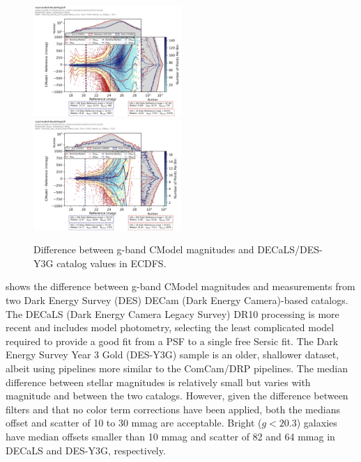 \begin{figure}
  \includegraphics[width=0.5\textwidth]{galaxy_photometry/cdfs_g_vs_DECaLS.png}
  \includegraphics[width=0.5\textwidth]{galaxy_photometry/cdfs_g_vs_desy3g.png}
  \caption{Difference between g-band CModel magnitudes and DECaLS/DES-Y3G catalog values in ECDFS.}
  \label{fig:cdfs_g_vs_des}
\end{figure}

 shows the difference between g-band CModel magnitudes and measurements from two Dark Energy Survey (DES) DECam (Dark Energy Camera)-based catalogs.
The DECaLS (Dark Energy Camera Legacy Survey) DR10 processing is more recent and includes model photometry, selecting the least complicated model required to provide a good fit from a PSF to a single free Sersic fit.
The Dark Energy Survey Year 3 Gold (DES-Y3G) sample is an older, shallower dataset, albeit using pipelines more similar to the ComCam/DRP pipelines.
The median difference between stellar magnitudes is relatively small but varies with magnitude and between the two catalogs.
However, given the difference between filters and that no color term corrections have been applied, both the medians offset and scatter of 10 to 30 mmag are acceptable.
Bright ($g < 20.3$) galaxies have median offsets smaller than 10 mmag and scatter of 82 and 64 mmag in DECaLS and DES-Y3G, respectively.


